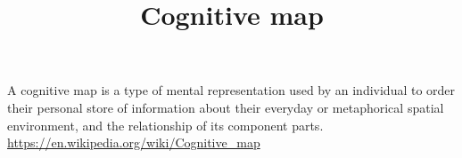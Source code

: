 \documentclass[a4paper]{article}
\title{Cognitive map}
\date{}
\begin{document}
    \maketitle
    A cognitive map is a type of mental representation used by an individual to order their personal store of information about their everyday or metaphorical spatial environment, and the relationship of its component parts. \url{https://en.wikipedia.org/wiki/Cognitive_map}
\end{document}
